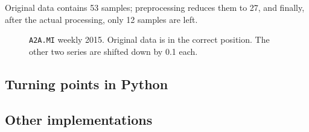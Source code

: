 \documentclass[a4paper]{article}
\begin{document}
Original data contains 53 samples; preprocessing reduces them to 27, and finally, after the actual processing, only 12 samples are left. 

\clearpage %

\begin{figure}%
	
	
	\caption{\texttt{A2A.MI} weekly 2015. Original data is in the correct position. The other two series are shifted down by 0.1 each.}\label{fig:a2a_w_2015}

\end{figure}


\subsection{Turning points in Python}\label{sec:tp_python}
\lipsum[1-3]



\subsection{Other implementations}\label{sec:other}
\lipsum[4-6]





\clearpage
{}
\nocite{*}
\printbibliography[title={Bibliography}, prenote=prenote] 
\end{document}
